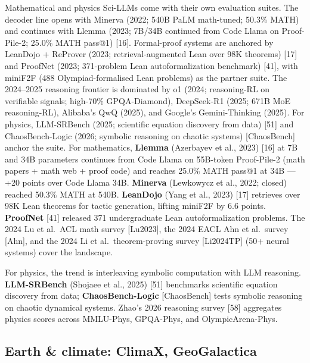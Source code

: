 Mathematical and physics Sci-LLMs come with their own evaluation suites. The decoder line opens with Minerva (2022; 540B PaLM math-tuned; 50.3\% MATH) and continues with Llemma (2023; 7B/34B continued from Code Llama on Proof-Pile-2; 25.0\% MATH pass@1) {[}16{]}. Formal-proof systems are anchored by LeanDojo + ReProver (2023; retrieval-augmented Lean over 98K theorems) {[}17{]} and ProofNet (2023; 371-problem Lean autoformalization benchmark) {[}41{]}, with miniF2F (488 Olympiad-formalised Lean problems) as the partner suite. The 2024--2025 reasoning frontier is dominated by o1 (2024; reasoning-RL on verifiable signals; high-70\% GPQA-Diamond), DeepSeek-R1 (2025; 671B MoE reasoning-RL), Alibaba's QwQ (2025), and Google's Gemini-Thinking (2025). For physics, LLM-SRBench (2025; scientific equation discovery from data) {[}51{]} and ChaosBench-Logic (2026; symbolic reasoning on chaotic systems) {[}ChaosBench{]} anchor the suite. For mathematics, \textbf{Llemma} (Azerbayev et al., 2023) {[}16{]} at 7B and 34B parameters continues from Code Llama on 55B-token Proof-Pile-2 (math papers + math web + proof code) and reaches 25.0\% MATH pass@1 at 34B --- +20 points over Code Llama 34B. \textbf{Minerva} (Lewkowycz et al., 2022; closed) reached 50.3\% MATH at 540B. \textbf{LeanDojo} (Yang et al., 2023) {[}17{]} retrieves over 98K Lean theorems for tactic generation, lifting miniF2F by 6.6 points. \textbf{ProofNet} {[}41{]} released 371 undergraduate Lean autoformalization problems. The 2024 Lu et al.~ACL math survey {[}Lu2023{]}, the 2024 EACL Ahn et al.~survey {[}Ahn{]}, and the 2024 Li et al.~theorem-proving survey {[}Li2024TP{]} (50+ neural systems) cover the landscape.

For physics, the trend is interleaving symbolic computation with LLM reasoning. \textbf{LLM-SRBench} (Shojaee et al., 2025) {[}51{]} benchmarks scientific equation discovery from data; \textbf{ChaosBench-Logic} {[}ChaosBench{]} tests symbolic reasoning on chaotic dynamical systems. Zhao's 2026 reasoning survey {[}58{]} aggregates physics scores across MMLU-Phys, GPQA-Phys, and OlympicArena-Phys.

\subsection{Earth \& climate: ClimaX, GeoGalactica}\label{earth-climate-climax-geogalactica}

